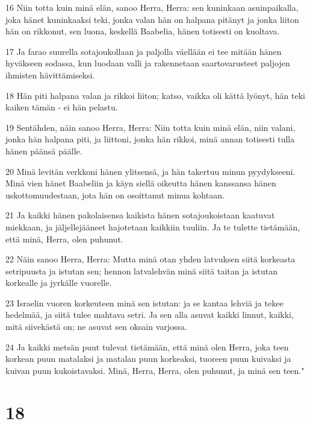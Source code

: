 \par 16 Niin totta kuin minä elän, sanoo Herra, Herra: sen kuninkaan asuinpaikalla, joka hänet kuninkaaksi teki, jonka valan hän on halpana pitänyt ja jonka liiton hän on rikkonut, sen luona, keskellä Baabelia, hänen totisesti on kuoltava.
\par 17 Ja farao suurella sotajoukollaan ja paljolla väellään ei tee mitään hänen hyväkseen sodassa, kun luodaan valli ja rakennetaan saartovarusteet paljojen ihmisten hävittämiseksi.
\par 18 Hän piti halpana valan ja rikkoi liiton; katso, vaikka oli kättä lyönyt, hän teki kaiken tämän - ei hän pelastu.
\par 19 Sentähden, näin sanoo Herra, Herra: Niin totta kuin minä elän, niin valani, jonka hän halpana piti, ja liittoni, jonka hän rikkoi, minä annan totisesti tulla hänen päänsä päälle.
\par 20 Minä levitän verkkoni hänen ylitsensä, ja hän takertuu minun pyydykseeni. Minä vien hänet Baabeliin ja käyn siellä oikeutta hänen kanssansa hänen uskottomuudestaan, jota hän on osoittanut minua kohtaan.
\par 21 Ja kaikki hänen pakolaisensa kaikista hänen sotajoukoistaan kaatuvat miekkaan, ja jäljellejääneet hajotetaan kaikkiin tuuliin. Ja te tulette tietämään, että minä, Herra, olen puhunut.
\par 22 Näin sanoo Herra, Herra: Mutta minä otan yhden latvuksen siitä korkeasta setripuusta ja istutan sen; hennon latvalehvän minä siitä taitan ja istutan korkealle ja jyrkälle vuorelle.
\par 23 Israelin vuoren korkeuteen minä sen istutan: ja se kantaa lehviä ja tekee hedelmää, ja siitä tulee mahtava setri. Ja sen alla asuvat kaikki linnut, kaikki, mitä siivekästä on; ne asuvat sen oksain varjossa.
\par 24 Ja kaikki metsän puut tulevat tietämään, että minä olen Herra, joka teen korkean puun matalaksi ja matalan puun korkeaksi, tuoreen puun kuivaksi ja kuivan puun kukoistavaksi. Minä, Herra, Herra, olen puhunut, ja minä sen teen."

\chapter{18}

